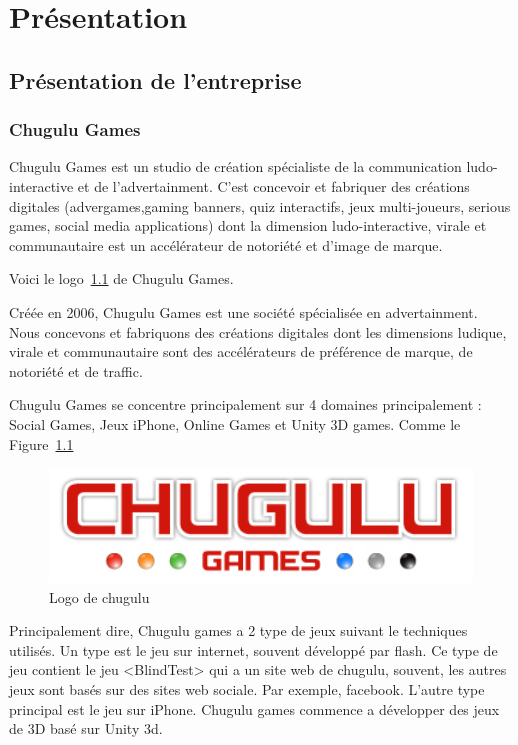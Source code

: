 \chapter{Présentation} %

\section{Présentation de l'entreprise} %

\subsection{Chugulu Games} %

Chugulu Games est un studio de création spécialiste de la communication ludo-interactive et de l'advertainment. C'est concevoir et fabriquer des créations digitales (advergames,gaming banners, quiz interactifs, jeux multi-joueurs, serious games, social media applications) dont la dimension ludo-interactive, virale et communautaire est un accélérateur de notoriété et d'image de marque.

Voici le logo~\ref{fig:Image_Chugulu_Games1} de Chugulu Games.

Créée en 2006, Chugulu Games est une société spécialisée en advertainment. Nous concevons et fabriquons des créations digitales dont les dimensions ludique, virale et communautaire sont des accélérateurs de préférence de marque, de notoriété et de traffic.

Chugulu Games se concentre principalement sur 4 domaines principalement : Social Games, Jeux iPhone, Online Games et Unity 3D games. Comme le Figure~\ref{fig:Image_Chugulu_Games1} 


\begin{figure}[htbp]
	\centering
		\includegraphics[width=6in]{Image/Chugulu-Games1.jpg}
	\caption{Logo de chugulu}
	\label{fig:Image_Chugulu_Games1}
\end{figure}

Principalement dire, Chugulu games a 2 type de jeux suivant le techniques utilisés. Un type est le jeu sur internet, souvent développé par flash. Ce type de jeu contient le jeu <BlindTest> qui a un site web de chugulu, souvent, les autres jeux sont basés sur des sites web sociale. Par exemple, facebook. L'autre type principal est le jeu sur iPhone. Chugulu games commence a développer des jeux de 3D basé sur Unity 3d. 

